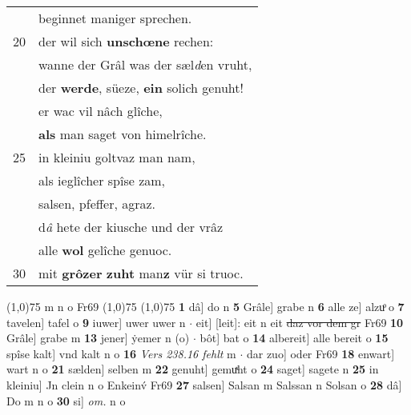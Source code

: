 \documentclass[8pt,a4paper,notitlepage]{article}
\begin{document}
\begin{table}[ht]
\begin{minipage}[t]{0.5\linewidth}
\begin{tabular}{rl}
 & beginnet maniger sprechen.\\ 
20 & der wil sich \textbf{unschœne} rechen:\\ 
 & wanne der Grâl was der sæl\textit{d}en vruht,\\ 
 & der \textbf{werde}, süeze, \textbf{ein} solich genuht!\\ 
 & er wac vil nâch glîche,\\ 
 & \textbf{als} man saget von himelrîche.\\ 
25 & in kleiniu goltvaz man nam,\\ 
 & als ieglîcher spîse zam,\\ 
 & salsen, pfeffer, agraz.\\ 
 & d\textit{â} hete der kiusche und der vrâz\\ 
 & alle \textbf{wol} gelîche genuoc.\\ 
30 & mit \textbf{grôzer} \textbf{zuht} man\textbf{z} vür si truoc.\\ 
\end{tabular}
\scriptsize
\line(1,0){75} \newline
m n o Fr69 \newline
\line(1,0){75} \newline
\newline
\line(1,0){75} \newline
\textbf{1} dâ] do n \textbf{5} Grâle] grabe n \textbf{6} alle ze] alzuͦ o \textbf{7} tavelen] tafel o \textbf{9} iuwer] uwer uwer n  $\cdot$ eit] [leit]: eit n eit \sout{daz vor dem gr} Fr69 \textbf{10} Grâle] grabe m \textbf{13} jener] ẏemer n (o)  $\cdot$ bôt] bat o \textbf{14} albereit] alle bereit o \textbf{15} spîse kalt] vnd kalt n o \textbf{16} \textit{Vers 238.16 fehlt} m   $\cdot$ dar zuo] oder Fr69 \textbf{18} enwart] wart n o \textbf{21} sælden] selben m \textbf{22} genuht] gemuͯht o \textbf{24} saget] sagete n \textbf{25} in kleiniu] Jn clein n o Enkeinv́ Fr69 \textbf{27} salsen] Salsan m Salssan n Solsan o \textbf{28} dâ] Do m n o \textbf{30} si] \textit{om.} n o \newline
\end{minipage}
\end{table}
\newpage
\end{document}
